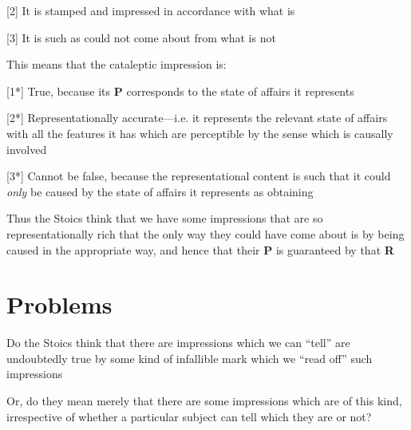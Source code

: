 \documentclass[11pt]{article}
\begin{document}
[2] It is stamped and impressed in accordance with what is
\vspace*{1mm}

[3] It is such as could not come about from what is not
\vspace*{2mm}

\noindent This means that the cataleptic impression is:
\vspace*{2mm}

[1*] True, because its \textbf{P} corresponds to the state of affairs it represents
\vspace*{1mm}

[2*] Representationally accurate---i.e. it represents the relevant state of affairs with all the features it has which are perceptible by the sense which is causally involved
\vspace*{1mm}

[3*] Cannot be false, because the representational content is such that it could \emph{only} be caused by the state of affairs it represents as obtaining
\vspace*{2mm}

\noindent Thus the Stoics think that we have some impressions that are so representationally rich that the only way they could have come about is by being caused in the appropriate way, and hence that their \textbf{P} is guaranteed by that \textbf{R}  

\section*{Problems}

\noindent Do the Stoics think that there are impressions which we can ``tell'' are undoubtedly true by some kind of infallible mark which we ``read off'' such impressions
\vspace*{2mm}

\noindent Or, do they mean merely that there are some impressions which are of this kind, irrespective of whether a particular subject can tell which they are or not?
\end{document}

